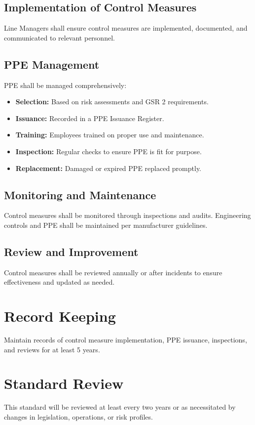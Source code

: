 \documentclass[12pt]{article}
\begin{document}
\subsection{Implementation of Control Measures}
Line Managers shall ensure control measures are implemented, documented, and communicated to relevant personnel.

\subsection{PPE Management}
PPE shall be managed comprehensively:
\begin{itemize}
    \item \textbf{Selection:} Based on risk assessments and GSR 2 requirements.
    \item \textbf{Issuance:} Recorded in a PPE Issuance Register.
    \item \textbf{Training:} Employees trained on proper use and maintenance.
    \item \textbf{Inspection:} Regular checks to ensure PPE is fit for purpose.
    \item \textbf{Replacement:} Damaged or expired PPE replaced promptly.
\end{itemize}

\subsection{Monitoring and Maintenance}
Control measures shall be monitored through inspections and audits. Engineering controls and PPE shall be maintained per manufacturer guidelines.

\subsection{Review and Improvement}
Control measures shall be reviewed annually or after incidents to ensure effectiveness and updated as needed.

\section{Record Keeping}
Maintain records of control measure implementation, PPE issuance, inspections, and reviews for at least 5 years.

\section{Standard Review}
This standard will be reviewed at least every two years or as necessitated by changes in legislation, operations, or risk profiles.
\end{document}
